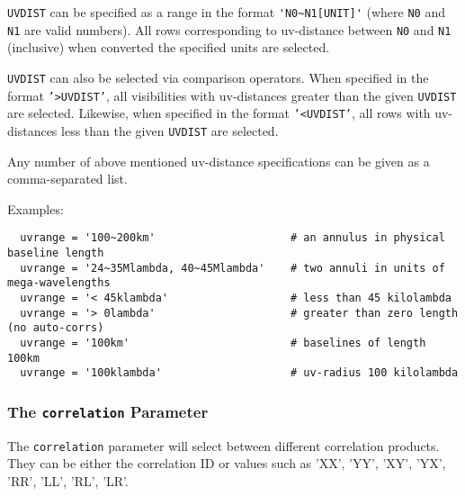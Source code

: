{\tt UVDIST} can be specified as a range in the format 
{\verb!'N0~N1[UNIT]'!} (where {\tt N0} and {\tt N1} are valid numbers).  All
rows corresponding to uv-distance between {\tt N0} and {\tt N1}
(inclusive) when converted the specified units are selected.

{\tt UVDIST} can also be selected via comparison operators.  When specified in
the format {\tt '>UVDIST'}, all visibilities with uv-distances greater than the
given {\tt UVDIST} are selected.  Likewise, when specified in the
format {\tt '<UVDIST'}, all rows with uv-distances less than the given
{\tt UVDIST} are selected.


Any number of above mentioned uv-distance specifications can be given
as a comma-separated list.

Examples:
\small
\begin{verbatim}
  uvrange = '100~200km'                     # an annulus in physical baseline length
  uvrange = '24~35Mlambda, 40~45Mlambda'    # two annuli in units of mega-wavelengths
  uvrange = '< 45klambda'                   # less than 45 kilolambda 
  uvrange = '> 0lambda'                     # greater than zero length (no auto-corrs)
  uvrange = '100km'                         # baselines of length 100km
  uvrange = '100klambda'                    # uv-radius 100 kilolambda
\end{verbatim}
\normalsize


\subsubsection{The {\tt correlation} Parameter}
\label{section:io.selection.selectdata.correlation}

The {\tt correlation} parameter will select between different
correlation products. They can be either the correlation ID or values
such as 'XX', 'YY', 'XY', 'YX', 'RR', 'LL', 'RL', 'LR'.

